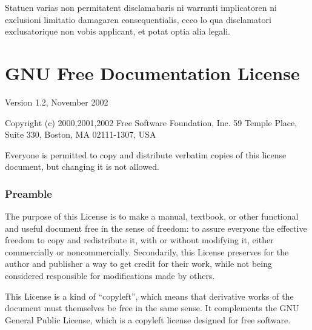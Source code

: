 
Statuen varias non permitatent disclamabaris ni warranti implicatoren
ni exclusioni limitatio damagaren consequentialis, ecco lo qua disclamatori
exclusato\-rique non vobis applicant, et potat optia alia legali.

\twocolumn

\chapter{GNU Free Documentation License\label{sec:GFDL} }

{\scriptsize{}Version 1.2, November 2002}{\scriptsize\par}

{\tiny{}Copyright (c) 2000,2001,2002 Free Software Foundation, Inc.
59 Temple Place, Suite 330, Boston, MA 02111-1307, USA}{\tiny\par}

{\tiny{}Everyone is permitted to copy and distribute verbatim copies
of this license document, but changing it is not allowed.}{\tiny\par}

{\tiny{}\setcounter{subsection}{-1}}{\tiny\par}

\subsection*{{\tiny{}Preamble}}

{\tiny{}The purpose of this License is to make a manual, textbook,
or other functional and useful document free in the sense of freedom:
to assure everyone the effective freedom to copy and redistribute
it, with or without modifying it, either commercially or noncommercially.
Secondarily, this License preserves for the author and publisher a
way to get credit for their work, while not being considered responsible
for modifications made by others.}{\tiny\par}

{\tiny{}This License is a kind of \textquotedblleft copyleft\textsf{''}, which
means that derivative works of the document must themselves be free
in the same sense. It complements the GNU General Public License,
which is a copyleft license designed for free software.}{\tiny\par}

